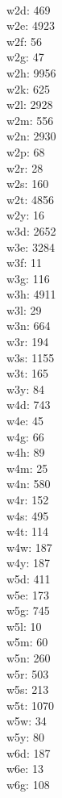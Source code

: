 \begin{multicols}{8}
  \\w2d: 469
  \\w2e: 4923
  \\w2f: 56
  \\w2g: 47
  \\w2h: 9956
  \\w2k: 625
  \\w2l: 2928
  \\w2m: 556
  \\w2n: 2930
  \\w2p: 68
  \\w2r: 28
  \\w2s: 160
  \\w2t: 4856
  \\w2y: 16
  \\w3d: 2652
  \\w3e: 3284
  \\w3f: 11
  \\w3g: 116
  \\w3h: 4911
  \\w3l: 29
  \\w3n: 664
  \\w3r: 194
  \\w3s: 1155
  \\w3t: 165
  \\w3y: 84
  \\w4d: 743
  \\w4e: 45
  \\w4g: 66
  \\w4h: 89
  \\w4m: 25
  \\w4n: 580
  \\w4r: 152
  \\w4s: 495
  \\w4t: 114
  \\w4w: 187
  \\w4y: 187
  \\w5d: 411
  \\w5e: 173
  \\w5g: 745
  \\w5l: 10
  \\w5m: 60
  \\w5n: 260
  \\w5r: 503
  \\w5s: 213
  \\w5t: 1070
  \\w5w: 34
  \\w5y: 80
  \\w6d: 187
  \\w6e: 13
  \\w6g: 108

\end{multicols}
